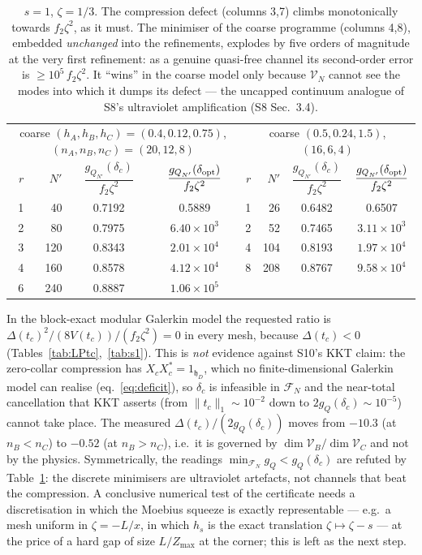 \documentclass[11pt]{article}
\newcommand{\hh}{\mathfrak h}
\newcommand{\e}[1]{\times10^{#1}}
\newcommand{\Zmax}{Z_{\max}}
\begin{document}
\begin{table}[h]\centering\small
\begin{tabular}{rrcc|rrcc}
\toprule
\multicolumn{4}{c|}{coarse $(h_A,h_B,h_C)=(0.4,0.12,0.75)$, $(n_A,n_B,n_C)=(20,12,8)$}&
\multicolumn{4}{c}{coarse $(0.5,0.24,1.5)$, $(16,6,4)$}\\
$r$&$N'$&$\dfrac{g_{Q_{N'}}(\delta_c)}{f_2\zeta^2}$&
$\dfrac{g_{Q_{N'}}(\delta_{\rm opt})}{f_2\zeta^2}$&
$r$&$N'$&$\dfrac{g_{Q_{N'}}(\delta_c)}{f_2\zeta^2}$&
$\dfrac{g_{Q_{N'}}(\delta_{\rm opt})}{f_2\zeta^2}$\\
\midrule
1& 40&0.7192&0.5889          &1& 26&0.6482&0.6507\\
2& 80&0.7975&$6.40\e{3}$     &2& 52&0.7465&$3.11\e{3}$\\
3&120&0.8343&$2.01\e{4}$     &4&104&0.8193&$1.97\e{4}$\\
4&160&0.8578&$4.12\e{4}$     &8&208&0.8767&$9.58\e{4}$\\
6&240&0.8887&$1.06\e{5}$     & &   &      &\\
\bottomrule
\end{tabular}
\caption{$s=1$, $\zeta=1/3$.  The compression defect (columns 3,7) climbs monotonically towards
$f_2\zeta^2$, as it must.  The minimiser of the coarse programme (columns 4,8), embedded
\emph{unchanged} into the refinements, explodes by five orders of magnitude at the very first
refinement: as a genuine quasi-free channel its second-order error is
$\ge10^5\,f_2\zeta^2$.  It ``wins'' in the coarse model only because $\mathcal V_N$ cannot see the
modes into which it dumps its defect --- the uncapped continuum analogue of S8's ultraviolet
amplification (S8 Sec.~3.4).}
\label{tab:refine}
\end{table}

\begin{verdictgap}
In the block-exact modular Galerkin model the requested ratio is
$\Delta(t_c)^2/(8V(t_c))\big/(f_2\zeta^2)=0$ in every mesh, because
$\Delta(t_c)<0$ (Tables~\ref{tab:LPtc},~\ref{tab:s1}).  This is \emph{not} evidence against S10's
KKT claim: the zero-collar compression has $X_cX_c^*=1_{\hh_D}$, which no finite-dimensional
Galerkin model can realise (eq.~\eqref{eq:deficit}), so $\delta_c$ is infeasible in
$\mathcal F_N$ and the near-total cancellation that KKT asserts (from
$\|t_c\|_1\sim10^{-2}$ down to $2g_Q(\delta_c)\sim10^{-5}$) cannot take place.  The measured
$\Delta(t_c)/(2g_Q(\delta_c))$ moves from $-10.3$ (at $n_B<n_C$) to $-0.52$ (at $n_B>n_C$),
i.e.\ it is governed by $\dim\mathcal V_B/\dim\mathcal V_C$ and not by the physics.  Symmetrically,
the readings $\min_{\mathcal F_N}g_Q<g_Q(\delta_c)$ are refuted by Table~\ref{tab:refine}: the
discrete minimisers are ultraviolet artefacts, not channels that beat the compression.  A
conclusive numerical test of the certificate needs a discretisation in which the Moebius squeeze
is exactly representable --- e.g.\ a mesh uniform in $\zeta=-L/x$, in which $h_s$ is the exact
translation $\zeta\mapsto\zeta-s$ --- at the price of a hard gap of size $L/\Zmax$ at the corner;
this is left as the next step.
\end{verdictgap}
\end{document}
